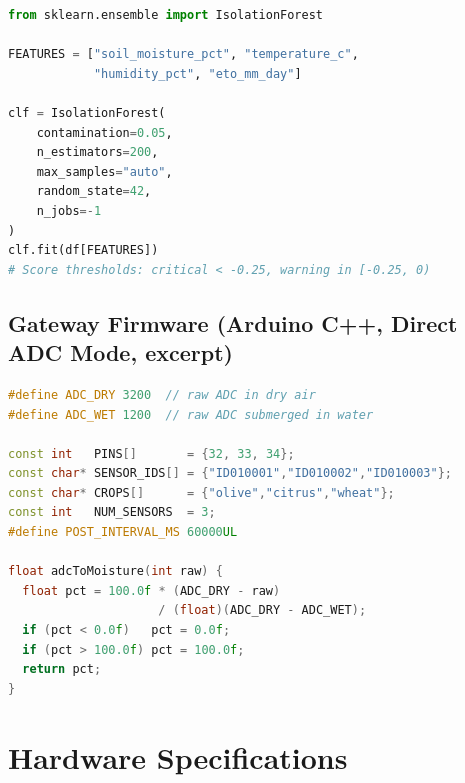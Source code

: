 \documentclass[12pt,a4paper]{report}
\begin{document}
\begin{lstlisting}[language=Python, caption={IsolationForest training configuration (anomaly\_detector.py)}]
from sklearn.ensemble import IsolationForest

FEATURES = ["soil_moisture_pct", "temperature_c",
            "humidity_pct", "eto_mm_day"]

clf = IsolationForest(
    contamination=0.05,
    n_estimators=200,
    max_samples="auto",
    random_state=42,
    n_jobs=-1
)
clf.fit(df[FEATURES])
# Score thresholds: critical < -0.25, warning in [-0.25, 0)
\end{lstlisting}

\section{Gateway Firmware (Arduino C++, Direct ADC Mode, excerpt)}

\begin{lstlisting}[language=C++, caption={Heltec WiFi LoRa 32 V3 direct ADC sensor reading (hardware/gateway/gateway.ino)}]
#define ADC_DRY 3200  // raw ADC in dry air
#define ADC_WET 1200  // raw ADC submerged in water

const int   PINS[]       = {32, 33, 34};
const char* SENSOR_IDS[] = {"ID010001","ID010002","ID010003"};
const char* CROPS[]      = {"olive","citrus","wheat"};
const int   NUM_SENSORS  = 3;
#define POST_INTERVAL_MS 60000UL

float adcToMoisture(int raw) {
  float pct = 100.0f * (ADC_DRY - raw)
                     / (float)(ADC_DRY - ADC_WET);
  if (pct < 0.0f)   pct = 0.0f;
  if (pct > 100.0f) pct = 100.0f;
  return pct;
}
\end{lstlisting}

\chapter{Hardware Specifications}
\end{document}
